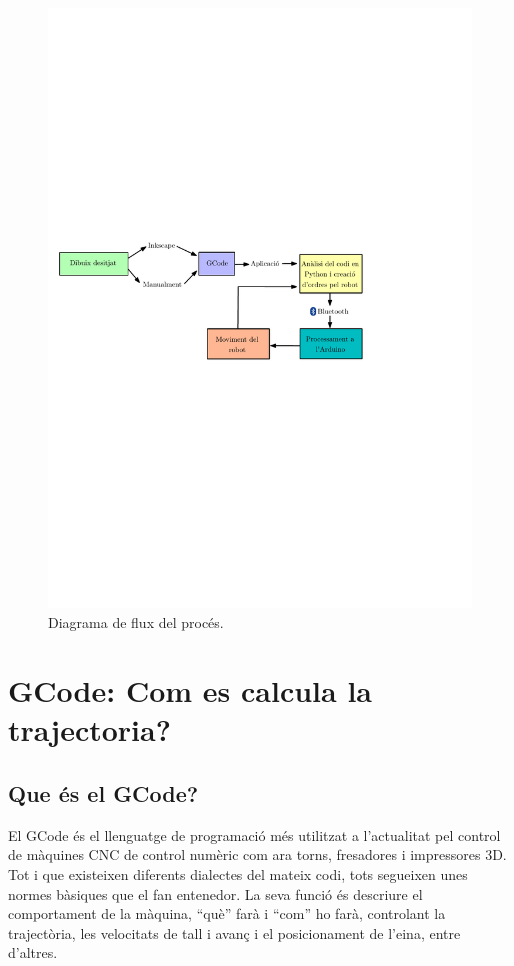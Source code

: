 \begin{figure}[H]
	\centering
	\includegraphics{figuretry}
	\caption{Diagrama de flux del procés.}
	\label{fig:diagflux}
\end{figure}




\section{GCode: Com es calcula la trajectoria?}

\subsection{Que és el GCode?}
El GCode és el llenguatge de programació més utilitzat a l'actualitat pel control de màquines CNC de control numèric com ara torns, fresadores i impressores 3D. Tot i que existeixen diferents dialectes del mateix codi, tots segueixen unes normes bàsiques que el fan entenedor. La seva funció és descriure el comportament de la màquina, “què” farà i “com” ho farà, controlant la trajectòria, les velocitats de tall i avanç i el posicionament de l'eina, entre d'altres.

